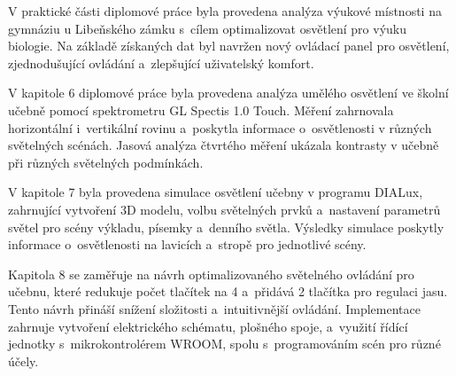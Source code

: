 V praktické části diplomové práce byla provedena analýza výukové místnosti na
gymnáziu u Libeňského zámku s~cílem optimalizovat osvětlení pro výuku biologie.
Na základě získaných dat byl navržen nový ovládací panel pro osvětlení,
zjednodušující ovládání a~zlepšující uživatelský komfort.

V kapitole 6 diplomové práce byla provedena analýza umělého osvětlení ve školní učebně
pomocí spektrometru GL Spectis 1.0 Touch.
Měření zahrnovala horizontální i~vertikální rovinu a~poskytla
informace o~osvětlenosti v různých světelných scénách.
Jasová analýza čtvrtého měření ukázala kontrasty v učebně při různých světelných podmínkách.

V kapitole 7 byla provedena simulace osvětlení učebny v programu DIALux,
zahrnující vytvoření 3D modelu, volbu světelných prvků a~nastavení parametrů
světel pro scény výkladu, písemky a~denního světla.
Výsledky simulace poskytly informace o~osvětlenosti na lavicích a~stropě pro jednotlivé scény.

Kapitola 8 se zaměřuje na návrh optimalizovaného světelného ovládání pro učebnu,
které redukuje počet tlačítek na 4 a~přidává 2 tlačítka pro regulaci jasu.
Tento návrh přináší snížení složitosti a~intuitivnější ovládání.
Implementace zahrnuje vytvoření elektrického schématu, plošného spoje, a~využití
řídící jednotky s~mikrokontrolérem  WROOM, spolu s~programováním scén pro různé účely.




